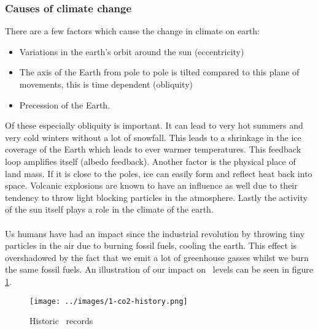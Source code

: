 \documentclass[../summary.tex]{subfiles}
\begin{document}
\subsubsection{Causes of climate change}
There are a few factors which cause the change in climate on earth:
\begin{itemize}
	\item Variations in the earth's orbit around the sun (eccentricity)
	\item The axis of the Earth from pole to pole is tilted compared to this plane of movements, this is time dependent (obliquity)
	\item Precession of the Earth.
\end{itemize}
Of these especially obliquity is important. It can lead to very hot summers and very cold winters without a lot of snowfall. This leads to a shrinkage in the ice coverage of the Earth which leads to ever warmer temperatures. This feedback loop amplifies itself (albedo feedback). Another factor is the physical place of land mass. If it is close to the poles, ice can easily form and reflect heat back into space. Volcanic explosions are known to have an influence as well due to their tendency to throw light blocking particles in the atmosphere. Lastly the activity of the sun itself plays a role in the climate of the earth.
\\\\
Us humans have had an impact since the industrial revolution by throwing tiny particles in the air due to burning fossil fuels, cooling the earth. This effect is overshadowed by the fact that we emit a lot of greenhouse gasses whilst we burn the same fossil fuels. An illustration of our impact on \COtwo\ levels can be seen in figure \ref{fig:co2-history}.
\begin{figure}[h]
	\centering
	\texttt{[image: ../images/1-co2-history.png]}
	\caption{Historic \COtwo\ records}
	\label{fig:co2-history}
\end{figure}

\newpage
\end{document}
